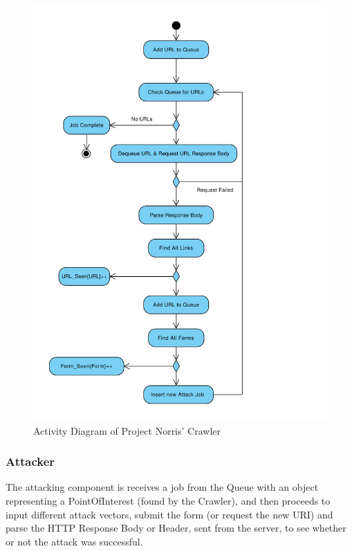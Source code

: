\documentclass[12pt,a4paper]{article}
\begin{document}
\begin{figure}[!ht]
    \begin{center}
        \includegraphics[scale=0.7]{images/crawler_activity_diagram.pdf}    
    \end{center}
    \caption{Activity Diagram of Project Norris' Crawler}
    \label{fig:crawler}
\end{figure}

\subsubsection{Attacker}
The attacking component is receives a job from the Queue with an object representing a PointOfInterest (found by the Crawler), and then proceeds to input different attack vectors, submit the form (or request the new URI) and parse the HTTP Response Body or Header, sent from the server, to see whether or not the attack was successful.
\end{document}
